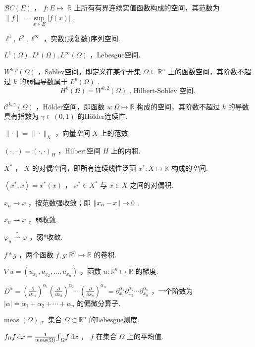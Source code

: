 $\mathcal{B}C\left( E\right)$ ， $f : E \mapsto \; \mathbb{R}$ 上所有有界连续实值函数构成的空间，其范数为 $\| f\|  = \mathop{\sup }\limits_{{x \in  E}}\left| {f\left( x\right) }\right|$ .

${\ell }^{1},{\ell }^{p},{\ell }^{\infty }$ ，实数(或复数)序列空间.

${L}^{1}\left( \Omega \right) ,{L}^{p}\left( \Omega \right) ,{L}^{\infty }\left( \Omega \right)$ ，Lebesgue空间.

${W}^{k,p}\left( \Omega \right)$ ，Soblev空间，即定义在某个开集 $\Omega  \subseteq  {\mathbb{R}}^{n}$ 上的函数空间，其阶数不超过 $k$ 的弱偏导数属于 ${L}^{p}\left( \Omega \right)$ .
\[
{H}^{k}\left( \Omega \right)  = {W}^{k,2}\left( \Omega \right) \text{ , Hilbert-Soblev 空间. }
\]

${\mathcal{C}}^{k,\gamma }\left( \Omega \right)$ ，Hölder空间，即函数 $u : \Omega  \mapsto  \mathbb{R}$ 构成的空间，其阶数不超过 $k$ 的导数具有指数为 $\gamma  \in  (0,1)$ 的Hölder连续性.

$\|  \cdot  \|  = \|  \cdot  {\| }_{X}$ ，向量空间 $X$ 上的范数.

$\left( {\cdot , \cdot  }\right)  = {\left( \cdot , \cdot  \right) }_{H}$ ，Hilbert空间 $H$ 上的内积.

${X}^{ * }$ ， $X$ 的对偶空间，即所有连续线性泛函 ${x}^{ * } : X \mapsto  \mathbb{K}$ 构成的空间.

$\left\langle  {{x}^{ * },x}\right\rangle   = {x}^{ * }\left( x\right)$ ， ${x}^{ * } \in  {X}^{ * }$ 与 $x \in  X$ 之间的对偶积.

${x}_{n} \rightarrow  x$ ，按范数强收敛；即 $\norm{{x}_{n} - x} \rightarrow  0$ .

${x}_{n} \rightharpoonup  x$ ，弱收敛.

${\varphi }_{n}\overset{ * }{ \rightharpoonup  }\varphi$ ，弱*收敛.

$f * g$ ，两个函数 $f,g : {\mathbb{R}}^{n} \mapsto  \mathbb{R}$ 的卷积.

$\nabla u = \left( {{u}_{{x}_{1}},{u}_{{x}_{2}},\ldots ,{u}_{{x}_{n}}}\right)$ ，函数 $u : {\mathbb{R}}^{n} \mapsto  \mathbb{R}$ 的梯度.

${D}^{\alpha } = {\left( \frac{\partial }{\partial {x}_{1}}\right) }^{{\alpha }_{1}}{\left( \frac{\partial }{\partial {x}_{2}}\right) }^{{\alpha }_{2}}\cdots {\left( \frac{\partial }{\partial {x}_{n}}\right) }^{{\alpha }_{n}} = {\partial }_{{x}_{1}}^{{\alpha }_{1}}{\partial }_{{x}_{2}}^{{\alpha }_{2}}\cdots {\partial }_{{x}_{n}}^{{\alpha }_{n}}$ ，一个阶数为 $\left| \alpha \right|  \doteq  {\alpha }_{1} + {\alpha }_{2} + \cdots  + {\alpha }_{n}$ 的偏微分算子.

meas $\left( \Omega \right)$ ，集合 $\Omega  \subset  {\mathbb{R}}^{n}$ 的Lebesgue测度.

${f}_{\Omega }{f\mathop{}\!\mathrm{d} x} = \frac{1}{\operatorname{meas}\left( \Omega \right) }{\int }_{\Omega }{f\mathop{}\!\mathrm{d} x}$ ， $f$ 在集合 $\Omega$ 上的平均值.
